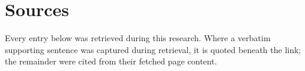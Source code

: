 \documentclass[11pt]{article}
\begin{document}
\vspace{0.8em}

\section*{Sources}
\small
\raggedright
\setlength{\parindent}{0pt}

Every entry below was retrieved during this research. Where a verbatim
supporting sentence was captured during retrieval, it is quoted beneath the
link; the remainder were cited from their fetched page content.
\vspace{0.4em}


\end{document}
